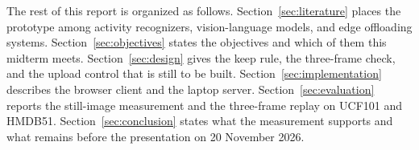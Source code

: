 The rest of this report is organized as follows.
Section~\ref{sec:literature} places the prototype among activity
recognizers, vision-language models, and edge offloading systems.
Section~\ref{sec:objectives} states the objectives and which of them this
midterm meets.
Section~\ref{sec:design} gives the keep rule, the three-frame check, and
the upload control that is still to be built.
Section~\ref{sec:implementation} describes the browser client and the
laptop server.
Section~\ref{sec:evaluation} reports the still-image measurement and the
three-frame replay on UCF101 and HMDB51.
Section~\ref{sec:conclusion} states what the measurement supports and what
remains before the presentation on 20 November 2026.
